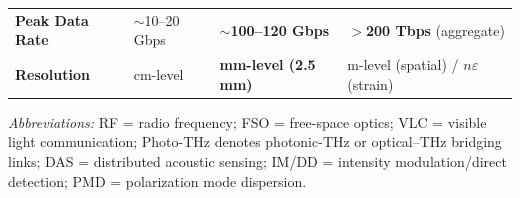 \begin{table}[!t]
\begin{tabularx}{\textwidth}{@{}%
        >{\raggedright\arraybackslash}p{2.35cm}
        >{\raggedright\arraybackslash}X
        >{\raggedright\arraybackslash}X
        >{\raggedright\arraybackslash}X
        @{}}
        \textbf{Peak Data Rate}                           &
        $\sim$10--20 Gbps                                 &
        \textbf{$\sim$100--120 Gbps} \cite{O_ISAC_105}    &
        \textbf{$>$200 Tbps} (aggregate) \cite{O_ISAC_046}  \\

        \textbf{Resolution}                               &
        cm-level                                          &
        \textbf{mm-level (2.5 mm)} \cite{O_ISAC_105}      &
        m-level (spatial) / $n\varepsilon$ (strain)         \\
        \bottomrule
    \end{tabularx}

    \vspace{2pt}
    \footnotesize
    \emph{Abbreviations:} RF = radio frequency; FSO = free-space optics; VLC = visible light communication;
    Photo-THz denotes photonic-THz or optical--THz bridging links; DAS = distributed acoustic sensing;
    IM/DD = intensity modulation/direct detection; PMD = polarization mode dispersion.
\end{table}

